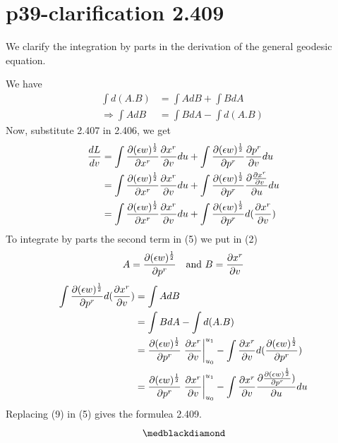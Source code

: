 \section{p39-clarification 2.409}

\begin{tcolorbox}
We clarify the integration by parts in the derivation of the general  geodesic equation.
\end{tcolorbox}
We have 
\begin{align}
\int d(A.B) &= \int AdB + \int BdA\\
\Rightarrow  \int AdB &= \int BdA -  \int d(A.B)\
\end{align}
Now, substitute 2.407 in 2.406, we get
\begin{align}
\dv{L}{v} &= \int \pdv{(\epsilon w)^{\frac{1}{2}}}{x^r} \pdv{x^r}{v} du +  \int \pdv{(\epsilon w)^{\frac{1}{2}}}{p^r} \pdv{p^r}{v} du\\
\ &= \int \pdv{(\epsilon w)^{\frac{1}{2}}}{x^r} \pdv{x^r}{v} du +  \int \pdv{(\epsilon w)^{\frac{1}{2}}}{p^r} \pdv{\pdv{x^r}{v}}{u} du\\
&= \int \pdv{(\epsilon w)^{\frac{1}{2}}}{x^r} \pdv{x^r}{v} du +  \int \pdv{(\epsilon w)^{\frac{1}{2}}}{p^r} d(\pdv{x^r}{v})
\end{align}
To integrate by parts the second term in (5) we put in (2)
$$A= \pdv{(\epsilon w)^{\frac{1}{2}}}{p^r} \quad \text{and } B = \pdv{x^r}{v}$$
\begin{align}
\int \pdv{(\epsilon w)^{\frac{1}{2}}}{p^r} d(\pdv{x^r}{v}) &= \int AdB \\
\ & = \int BdA -  \int d(A.B)\\
\ &= \pdv{(\epsilon w)^{\frac{1}{2}}}{p^r}\left.\pdv{x^r}{v}\right|_{u_0}^{u_1} - \int \pdv{x^r}{v}d(\pdv{(\epsilon w)^{\frac{1}{2}}}{p^r} )\\
\ &= \pdv{(\epsilon w)^{\frac{1}{2}}}{p^r}\left.\pdv{x^r}{v}\right|_{u_0}^{u_1} - \int \pdv{x^r}{v}\pdv{\pdv{(\epsilon w)^{\frac{1}{2}}}{p^r} )}{u}du
\end{align}
Replacing (9) in (5) gives the formulea 2.409.
$$\medblackdiamond$$
\newpage

